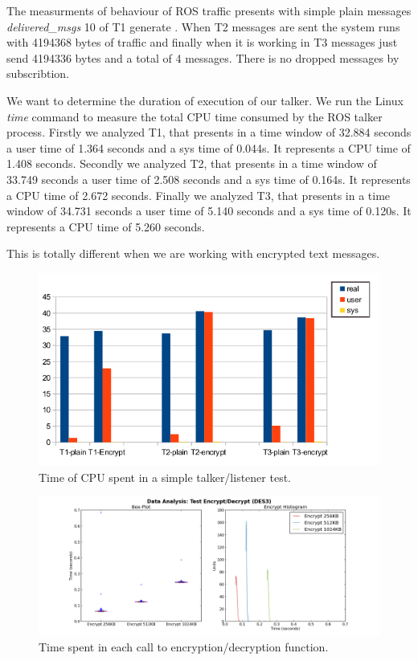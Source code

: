 \documentclass[journal,twoside]{JoPhA}
\begin{document}
The measurments of behaviour of ROS traffic presents with simple plain messages {\em delivered\_msgs} 10 of T1 generate . When T2 messages are sent the system runs with 4194368 bytes of traffic and finally when it is working in  T3 messages just send 4194336 bytes and a total of 4 messages. There is no dropped messages by subscribtion.

We want to determine the duration of execution of our talker. We run the Linux {\em time} command to measure the total CPU time consumed by the ROS talker process. 
Firstly we analyzed T1, that presents in a time window of 32.884 seconds a user time of  1.364 seconds and a sys time of 0.044s. It represents a CPU time of 1.408 seconds.
Secondly we analyzed T2, that presents in a time window of 33.749 seconds a user time of  2.508 seconds and a sys time of 0.164s. It represents a CPU time of 2.672 seconds.
Finally we analyzed T3, that presents in a time window of 34.731 seconds a user time of  5.140 seconds and a sys time of 0.120s. It represents a CPU time of 5.260 seconds.

This is totally different when we are working with encrypted text messages. 


\begin{figure}[ht!]
    \centering
    \includegraphics[width=.5\textwidth]{Tiempos_CPU_cifrado_texto.png}
    \caption{Time of CPU spent in a simple talker/listener test.}
  \label{fig:images_encryption}
\end{figure}




\begin{figure}[ht!]
    \centering
    \includegraphics[width=.9\textwidth]{Outline_encryption_text.png}
    \caption{Time spent in each call to encryption/decryption function.}
  \label{fig:images_encryption}
\end{figure}
\end{document}
